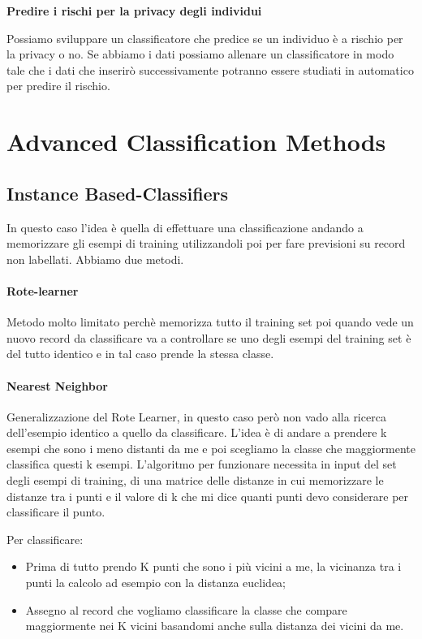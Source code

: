 \documentclass[14pt]{extreport}
\begin{document}
\textbf{Predire i rischi per la privacy degli individui}

Possiamo sviluppare un classificatore che predice se un individuo è a rischio per la privacy o no. Se abbiamo i dati possiamo allenare un classificatore in modo tale che i dati che inserirò successivamente potranno essere studiati in automatico per predire il rischio.



\chapter{Advanced Classification Methods}

\section{Instance Based-Classifiers}

In questo caso l'idea è quella di effettuare una classificazione andando a memorizzare gli esempi di training utilizzandoli poi per fare previsioni su record non labellati.
Abbiamo due metodi.

\subsubsection{Rote-learner}

Metodo molto limitato perchè memorizza tutto il training set poi quando vede un nuovo record da classificare va a controllare se uno degli esempi del training set è del tutto identico e in tal caso prende la stessa classe.

\subsubsection{Nearest Neighbor}

Generalizzazione del Rote Learner, in questo caso però non vado alla ricerca dell'esempio identico a quello da classificare.
L'idea è di andare a prendere k esempi che sono i meno distanti da me e poi scegliamo la classe che maggiormente classifica questi k esempi.
L'algoritmo per funzionare necessita in input del set degli esempi di training, di una matrice delle distanze in cui memorizzare le distanze tra i punti e il valore di k che mi dice quanti punti devo considerare per classificare il punto.

Per classificare:
\begin{itemize}
    \item Prima di tutto prendo K punti che sono i più vicini a me, la vicinanza tra i punti la calcolo ad esempio con la distanza euclidea;
    \item Assegno al record che vogliamo classificare la classe che compare maggiormente nei K vicini basandomi anche sulla distanza dei vicini da me.
\end{itemize}
\end{document}

